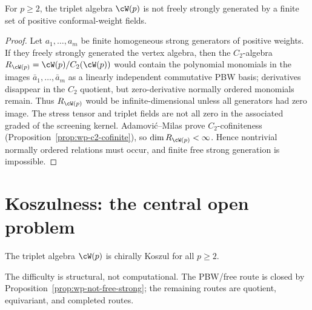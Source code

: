 \begin{proposition}\label{prop:wp-not-free-strong}
For $p\ge2$, the triplet algebra $\cW(p)$ is not freely strongly
generated by a finite set of positive conformal-weight fields.
\end{proposition}

\begin{proof}
Let $a_1,\ldots,a_m$ be finite homogeneous strong generators of
positive weights. If they freely strongly generated the vertex
algebra, then the $C_2$-algebra
$R_{\cW(p)}=\cW(p)/C_2(\cW(p))$ would contain the polynomial
monomials in the images $\bar a_1,\ldots,\bar a_m$ as a linearly
independent commutative PBW basis; derivatives disappear in the
$C_2$ quotient, but zero-derivative normally ordered monomials
remain. Thus $R_{\cW(p)}$ would be infinite-dimensional unless all
generators had zero image. The stress tensor and triplet fields are
not all zero in the associated graded of the screening kernel.
Adamovi\'c--Milas prove $C_2$-cofiniteness
(Proposition~\ref{prop:wp-c2-cofinite}), so
$\dim R_{\cW(p)}<\infty$. Hence nontrivial normally ordered
relations must occur, and finite free strong generation is
impossible.
\end{proof}



\section{Koszulness: the central open problem}
\label{sec:wp-koszulness}

\begin{conjecture}\label{conj:wp-koszulness}
The triplet algebra $\cW(p)$ is chirally Koszul for all
$p \geq 2$.
\end{conjecture}

The difficulty is structural, not computational. The PBW/free route
is closed by Proposition~\ref{prop:wp-not-free-strong}; the remaining
routes are quotient, equivariant, and completed routes.

